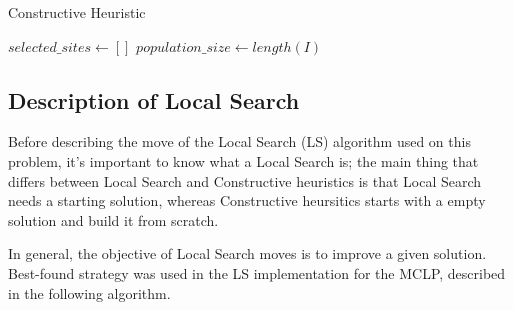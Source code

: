 \documentclass[11pt, a4paper]{article}
\begin{document}
\begin{algorithm}[H]
	\caption{Constructive Heuristic}\label{pseudo: ch}
	\SetAlgoLined

	\KwResult{}
	$selected\_sites \gets []$\;
	$population\_size \gets length(I)$\;
	\BlankLine
	\BlankLine
	
\end{algorithm}

\subsection{Description of Local Search}
Before describing the move of the Local Search (LS) algorithm used on this problem, it's important to know what a Local Search is; the main thing that differs between Local Search and Constructive heuristics is that Local Search needs a starting solution, whereas Constructive heursitics starts with a empty solution and build it from scratch. 

In general, the objective of Local Search moves is to improve a given solution. Best-found strategy was used in the LS implementation for the MCLP, described in the following algorithm.
\end{document}
